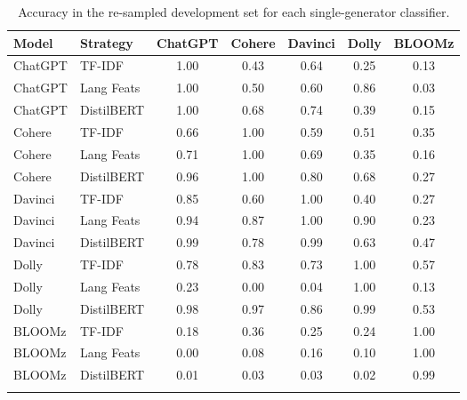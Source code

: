 \begin{table}[ht]
    \vspace{0.1cm}
    \centering
    \begin{tabular}{llccccc}
        \toprule
        Model   & Strategy   & ChatGPT & Cohere & Davinci & Dolly & BLOOMz \\
        \midrule
        ChatGPT & TF-IDF     & 1.00    & 0.43   & 0.64    & 0.25  & 0.13   \\
        ChatGPT & Lang Feats & 1.00    & 0.50   & 0.60    & 0.86  & 0.03   \\
        ChatGPT & DistilBERT & 1.00    & 0.68   & 0.74    & 0.39  & 0.15   \\
        Cohere  & TF-IDF     & 0.66    & 1.00   & 0.59    & 0.51  & 0.35   \\
        Cohere  & Lang Feats & 0.71    & 1.00   & 0.69    & 0.35  & 0.16   \\
        Cohere  & DistilBERT & 0.96    & 1.00   & 0.80    & 0.68  & 0.27   \\
        Davinci & TF-IDF     & 0.85    & 0.60   & 1.00    & 0.40  & 0.27   \\
        Davinci & Lang Feats & 0.94    & 0.87   & 1.00    & 0.90  & 0.23   \\
        Davinci & DistilBERT & 0.99    & 0.78   & 0.99    & 0.63  & 0.47   \\
        Dolly   & TF-IDF     & 0.78    & 0.83   & 0.73    & 1.00  & 0.57   \\
        Dolly   & Lang Feats & 0.23    & 0.00   & 0.04    & 1.00  & 0.13   \\
        Dolly   & DistilBERT & 0.98    & 0.97   & 0.86    & 0.99  & 0.53   \\
        BLOOMz  & TF-IDF     & 0.18    & 0.36   & 0.25    & 0.24  & 1.00   \\
        BLOOMz  & Lang Feats & 0.00    & 0.08   & 0.16    & 0.10  & 1.00   \\
        BLOOMz  & DistilBERT & 0.01    & 0.03   & 0.03    & 0.02  & 0.99   \\
        \bottomrule
        \vspace{0.1cm}
    \end{tabular}
    \caption{
        Accuracy in the re-sampled development set for each single-generator classifier.
    }
    \label{tab:generalization}
\end{table}

